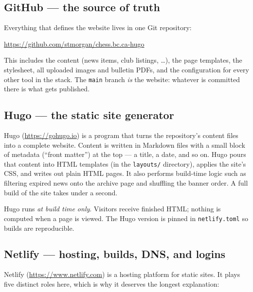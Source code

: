 \documentclass[12pt,letterpaper]{article}
\begin{document}
\subsection{GitHub --- the source of truth}

Everything that defines the website lives in one Git repository:

\begin{center}
\url{https://github.com/stmorgan/chess.bc.ca-hugo}
\end{center}

This includes the content (news items, club listings, \ldots), the page
templates, the stylesheet, all uploaded images and bulletin PDFs, and the
configuration for every other tool in the stack. The \texttt{main} branch
\emph{is} the website: whatever is committed there is what gets published.

\subsection{Hugo --- the static site generator}

Hugo (\url{https://gohugo.io}) is a program that turns the repository's
content files into a complete website. Content is written in Markdown files
with a small block of metadata (``front matter'') at the top --- a title, a
date, and so on. Hugo pours that content into HTML templates (in the
\texttt{layouts/} directory), applies the site's CSS, and writes out plain
HTML pages. It also performs build-time logic such as filtering expired news
onto the archive page and shuffling the banner order. A full build of the
site takes under a second.

Hugo runs \emph{at build time only}. Visitors receive finished HTML; nothing
is computed when a page is viewed. The Hugo version is pinned in
\texttt{netlify.toml} so builds are reproducible.

\subsection{Netlify --- hosting, builds, DNS, and logins}

Netlify (\url{https://www.netlify.com}) is a hosting platform for static
sites. It plays five distinct roles here, which is why it deserves the
longest explanation:
\end{document}
